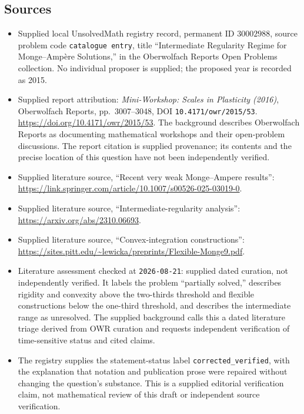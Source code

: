 \documentclass[11pt]{article}
\begin{document}
\subsection{Sources}
\begin{itemize}
\item Supplied local UnsolvedMath registry record, permanent ID \(30002988\), source problem code \texttt{catalogue entry}, title ``Intermediate Regularity Regime for Monge--Amp\`ere Solutions,'' in the Oberwolfach Reports Open Problems collection. No individual proposer is supplied; the proposed year is recorded as 2015.
\item Supplied report attribution: \emph{Mini-Workshop: Scales in Plasticity (2016)}, Oberwolfach Reports, pp.~3007--3048, DOI \texttt{10.4171/owr/2015/53}. \url{https://doi.org/10.4171/owr/2015/53}. The background describes Oberwolfach Reports as documenting mathematical workshops and their open-problem discussions. The report citation is supplied provenance; its contents and the precise location of this question have not been independently verified.
\item Supplied literature source, ``Recent very weak Monge--Ampere results'': \url{https://link.springer.com/article/10.1007/s00526-025-03019-0}.
\item Supplied literature source, ``Intermediate-regularity analysis'': \url{https://arxiv.org/abs/2310.06693}.
\item Supplied literature source, ``Convex-integration constructions'': \url{https://sites.pitt.edu/~lewicka/preprints/Flexible-Monge9.pdf}.
\item Literature assessment checked at \texttt{2026-08-21}: supplied dated curation, not independently verified. It labels the problem ``partially solved,'' describes rigidity and convexity above the two-thirds threshold and flexible constructions below the one-third threshold, and describes the intermediate range as unresolved. The supplied background calls this a dated literature triage derived from OWR curation and requests independent verification of time-sensitive status and cited claims.
\item The registry supplies the statement-status label \texttt{corrected\_verified}, with the explanation that notation and publication prose were repaired without changing the question's substance. This is a supplied editorial verification claim, not mathematical review of this draft or independent source verification.
\end{itemize}
\end{document}

